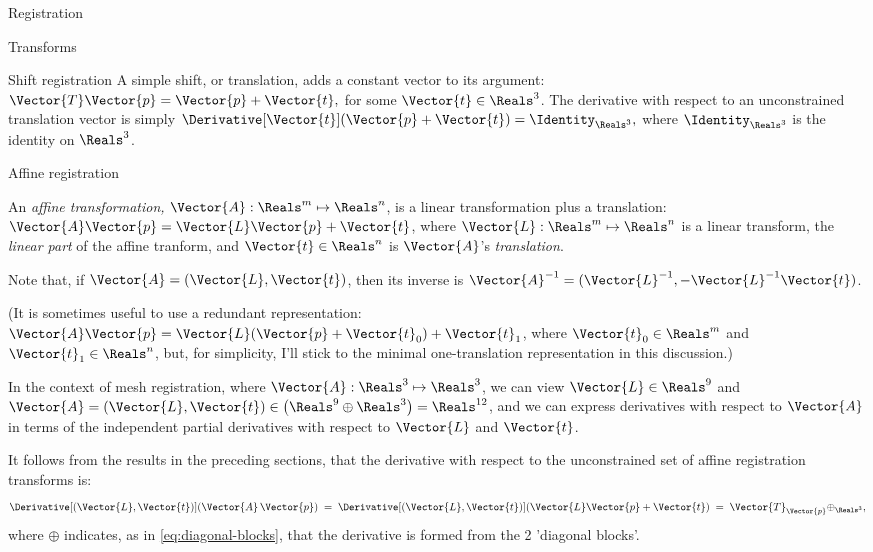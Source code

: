 \begin{plSection}{Registration}
\begin{plSection}{Transforms}
\begin{plSection}{Shift registration}
A simple shift, or translation, adds a constant vector
to its argument: $\Vector{T} \Vector{p} = \Vector{p} + \Vector{t},$
for some $\Vector{t} \in \Reals^3$.
The derivative with respect to
an unconstrained translation vector
is simply
$\Derivative[\Vector{t}]
{(\Vector{p} + \Vector{t})} 
= \Identity_{\Reals^3},$
where $\Identity_{\Reals^3}$ is the identity on $\Reals^3$.

\end{plSection}%
\begin{plSection}{Affine registration}
\label{sec:affine-registration}

An {\it affine transformation,} $\Vector{A} : \Reals^m \mapsto \Reals^n$,
is a linear transformation plus a translation:
$\Vector{A} \Vector{p} = \Vector{L} \Vector{p} + \Vector{t}$,
where $\Vector{L} : \Reals^m \mapsto \Reals^n$ is a linear transform,
the {\it linear part} of the affine tranform,
and $\Vector{t} \in \Reals^n$ is $\Vector{A}$'s {\it translation}.

Note that, if $\Vector{A} = (\Vector{L},\Vector{t})$, then its inverse is
$\Vector{A}^{-1} = (\Vector{L}^{-1}, - \Vector{L}^{-1}\Vector{t})$.

(It is sometimes useful to use a redundant representation:
$\Vector{A} \Vector{p} 
= \Vector{L} (\Vector{p} + \Vector{t}_0) + \Vector{t}_1$,
where $\Vector{t}_0 \in \Reals^m$ and $\Vector{t}_1 \in \Reals^n$,
but, for simplicity, I'll stick to the minimal one-translation
representation in this discussion.)

In the context of mesh registration,
where $\Vector{A} : \Reals^3 \mapsto \Reals^3$,
we can view $\Vector{L} \in \Reals^9$ and
$\Vector{A} = (\Vector{L}, \Vector{t}) \in \left(\Reals^9 \oplus \Reals^3 \right)= \Reals^{12}$,
and we can express derivatives with respect to $\Vector{A}$
in terms of the independent partial derivatives
with respect to $\Vector{L}$ and $\Vector{t}$.

It follows from the results in the preceding sections,
that the derivative with respect to the
unconstrained set of affine registration transforms is:
\begin{equation}
\label{eq:affine-transform-derivative}
\Derivative[(\Vector{L},\Vector{t})]{\left( \Vector{A} \, \Vector{p} \right)}
 \; = \;
\Derivative[(\Vector{L},\Vector{t})]{\left( \Vector{L} \Vector{p} + \Vector{t} \right)}
 \; = \;
\Vector{T}_{\Vector{p}} \oplus _{\Reals^3},
\end{equation}
where $\oplus$ indicates,
as in \cref{eq:diagonal-blocks},
that the derivative is formed from the 2
'diagonal blocks'.


\end{plSection}
\end{plSection}
\end{plSection}
